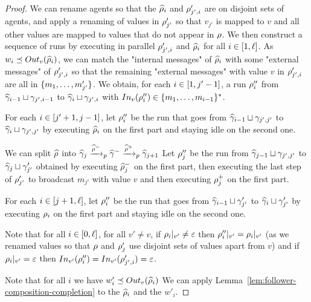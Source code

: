 \begin{proof}
We can rename agents so that the $\widehat{\run}_i$ and $\run'_{j',i}$ are on disjoint sets of agents, and apply a renaming of values in $\run'_{j'}$ so that $v_{j'}$ is mapped to $v$ and all other values are mapped to values that do not appear in $\run$.
We then construct a sequence of runs by executing in parallel $\run_{j',i}'$ and $\widehat{\run}_i$ for all $i\in\nset{1}{\ell}$. As $w_i \subword \voutput{v}{\widehat{\run}_i}$, we can match the "internal messages" of $\widehat{\run}_i$ with some "external messages" of $\run'_{j',i}$ so that the remaining "external messages" with value $v$ in $\run'_{j',i}$ are all in $\set{m_1, \ldots, m'_{j'}}$. 
We obtain, for each $i \in \nset{1}{j'-1}$, a run $\run''_i$ from $\widehat{\config}_{i-1} \sqcup \config_{j', i-1}$ to $\widehat{\config}_{i} \sqcup \config_{j', i}$ with $\vinput{v}{\run''_i} \in \set{m_1, \ldots, m_{i-1}}^*$. 

For each $i \in \nset{j'+1}{j-1}$, let $\run''_i$ be the run that goes from $\widehat{\config}_{i-1} \sqcup \config_{j', j'}$ to $\widehat{\config}_{i} \sqcup \config_{j', j'}$ by executing $\widehat{\run}_i$ on the first part and staying idle on the second one.

We can split $\widehat{\run}$ into $\widehat{\config}_{j} \pstep{\widehat{\run}^-} \widehat{\config}^- \pstep{\widehat{\run}^+} \widehat{\config}_{j+1}$
Let $\run''_j$ be the run from $\widehat{\config}_{j-1} \sqcup \config_{j', j'}$ to $\widehat{\config}_{j} \sqcup \config'_{j'}$ obtained by executing $\widehat{\run}_{j}^-$ on the first part, then executing the last step of $\run'_{j'}$ to broadcast $m_{j'}$ with value $v$ and then executing $\run_{j}^+$ on the first part.

For each $i \in \nset{j+1}{\ell}$, let $\run''_i$ be the run that goes from $\widehat{\config}_{i-1} \sqcup \config'_{j'}$ to $\widehat{\config}_{i} \sqcup \config'_{j'}$ by executing $\run_i$ on the first part and staying idle on the second one. 

Note that for all $i \in \nset{0}{\ell}$, for all $v' \neq v$, if $\vproj{v'}{\run_i} \neq \epsilon$ then $\vproj{v'}{\run''_i} = \vproj{v'}{\run_i}$ (as we renamed values so that $\run$ and $\run'_j$ use disjoint sets of values apart from $v$) and if $\vproj{v'}{\run_i} = \epsilon$ then $\vinput{v'}{\run''_i} = \vinput{v'}{\run'_{j',i}} = \epsilon$.

Note that for all $i$ we have $w'_i \subword \voutput{v}{\widehat{\run}_i}$
We can apply Lemma~\ref{lem:follower-composition-completion} to the $\widehat{\run}_i$ and the $w'_i$.


\end{proof}
